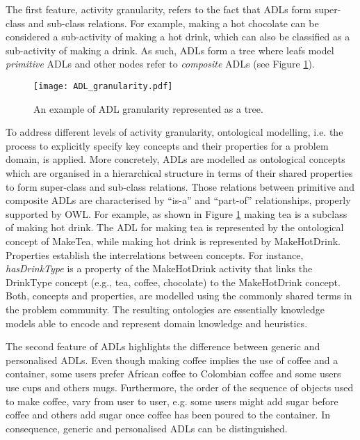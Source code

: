 The first feature, activity granularity, refers to the fact that ADLs form super-class and sub-class relations. For example, making a hot chocolate can be considered a sub-activity of making a hot drink, which can also be classified as a sub-activity of making a drink. As such, ADLs form a tree where leafs model \textit{primitive} ADLs and other nodes refer to \textit{composite} ADLs (see Figure \ref{fig-adl-granularity}).

\begin{figure}[htbp]%
\centering
\texttt{[image: ADL\_granularity.pdf]}
    \caption{An example of ADL granularity represented as a tree.} 
    \label{fig-adl-granularity}
\end{figure}

To address different levels of activity granularity, ontological modelling, i.e. the process to explicitly specify key concepts and their properties for a problem domain, is applied. More concretely, ADLs are modelled as ontological concepts which are organised in a hierarchical structure in terms of their shared properties to form super-class and sub-class relations. Those relations between primitive and composite ADLs are characterised by ``is-a'' and ``part-of'' relationships, properly supported by OWL. For example, as shown in Figure \ref{fig-adl-granularity} making tea is a subclass of making hot drink. The ADL for making tea is represented by the ontological concept of MakeTea, while making hot drink is represented by MakeHotDrink. Properties establish the interrelations between concepts. For instance, \textit{hasDrinkType} is a property of the MakeHotDrink activity that links the DrinkType concept (e.g., tea, coffee, chocolate) to the MakeHotDrink concept. Both, concepts and properties, are modelled using the commonly shared terms in the problem community. The resulting ontologies are essentially knowledge models able to encode and represent domain knowledge and heuristics. 

The second feature of ADLs highlights the difference between generic and personalised ADLs. Even though making coffee implies the use of coffee and a container, some users prefer African coffee to Colombian coffee and some users use cups and others mugs. Furthermore, the order of the sequence of objects used to make coffee, vary from user to user, e.g. some users might add sugar before coffee and others add sugar once coffee has been poured to the container. In consequence, generic and personalised ADLs can be distinguished.

